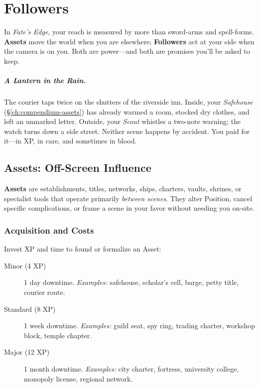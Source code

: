 
\chapter{Followers}
\label{ch:followers}

\begin{multicols}{2}

In \textit{Fate’s Edge}, your reach is measured by more than sword-arms and spell-forms. \textbf{Assets} move the world when you are elsewhere; \textbf{Followers} act at your side when the camera is on you. Both are power—and both are promises you’ll be asked to keep.

\paragraph{A Lantern in the Rain.}
The courier taps twice on the shutters of the riverside inn. Inside, your \emph{Safehouse} (\S\ref{ch:compendium-assets}) has already warmed a room, stocked dry clothes, and left an unmarked letter. Outside, your \emph{Scout} whistles a two-note warning; the watch turns down a side street. Neither scene happens by accident. You paid for it—in XP, in care, and sometimes in blood.

\section{Assets: Off-Screen Influence}

\textbf{Assets} are establishments, titles, networks, ships, charters, vaults, shrines, or specialist tools that operate primarily \emph{between scenes}. They alter Position, cancel specific complications, or frame a scene in your favor without needing you on-site.

\subsection*{Acquisition and Costs}
Invest XP and time to found or formalize an Asset:
\begin{description}
  \item[Minor (4 XP)]  1 day downtime. \emph{Examples:} safehouse, scholar’s cell, barge, petty title, courier route.
  \item[Standard (8 XP)]  1 week downtime. \emph{Examples:} guild seat, spy ring, trading charter, workshop block, temple chapter.
  \item[Major (12 XP)]  1 month downtime. \emph{Examples:} city charter, fortress, university college, monopoly license, regional network.
\end{description}


\end{multicols}
